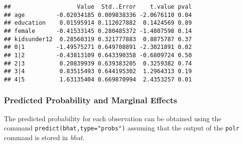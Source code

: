 \documentclass[
]{article}
\newenvironment{Shaded}{\begin{snugshade}}{\end{snugshade}}
\newcommand{\DataTypeTok}[1]{\textcolor[rgb]{0.13,0.29,0.53}{#1}}
\newcommand{\DecValTok}[1]{\textcolor[rgb]{0.00,0.00,0.81}{#1}}
\newcommand{\KeywordTok}[1]{\textcolor[rgb]{0.13,0.29,0.53}{\textbf{#1}}}
\newcommand{\NormalTok}[1]{#1}
\newcommand{\OperatorTok}[1]{\textcolor[rgb]{0.81,0.36,0.00}{\textbf{#1}}}
\newcommand{\OtherTok}[1]{\textcolor[rgb]{0.56,0.35,0.01}{#1}}
\newcommand{\StringTok}[1]{\textcolor[rgb]{0.31,0.60,0.02}{#1}}
\begin{document}
\begin{Shaded}
\end{Shaded}

\begin{verbatim}
##                   Value  Std..Error    t.value pval
## age         -0.02034185 0.009838336 -2.0676110 0.04
## education    0.01595914 0.112027882  0.1424569 0.89
## female      -0.41533145 0.280485372 -1.4807598 0.14
## kidsunder12  0.28560319 0.321777883  0.8875787 0.37
## 0|1         -1.49575271 0.649708891 -2.3021891 0.02
## 1|2         -0.43813109 0.643390358 -0.6809724 0.50
## 2|3          0.20839939 0.639383205  0.3259382 0.74
## 3|4          0.83515493 0.644195302  1.2964313 0.19
## 4|5          1.63135404 0.669870994  2.4353257 0.01
\end{verbatim}

\hypertarget{predicted-probability-and-marginal-effects}{%
\subsubsection{Predicted Probability and Marginal Effects}\label{predicted-probability-and-marginal-effects}}

The predicted probability for each observation can be obtained using the command \texttt{predict(bhat,type="probs")} assuming that the output of the \texttt{polr} command is stored in \emph{bhat}.

\begin{Shaded}
\end{Shaded}
\end{document}
